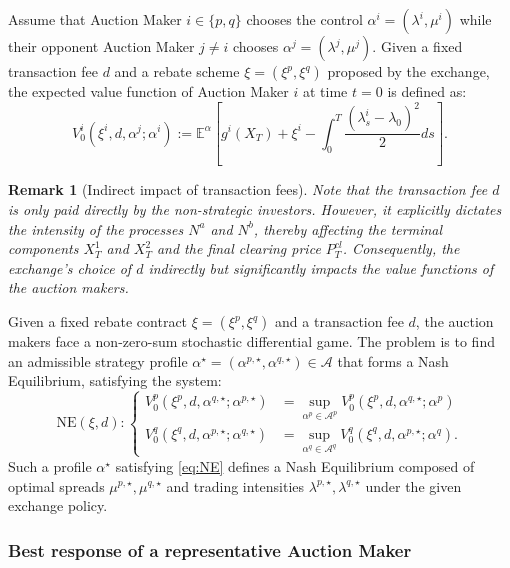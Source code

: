 \documentclass[12pt]{article}
\newtheorem{remark}[theorem2]{Remark}
\begin{document}
Assume that Auction Maker $i \in \{p,q\}$ chooses the control $\alpha^i=(\lambda^i,\mu^i)$ while their opponent Auction Maker $j \neq i$ chooses $\alpha^j=(\lambda^j,\mu^j)$. Given a fixed transaction fee $d$ and a rebate scheme $\xi=(\xi^p,\xi^q)$ proposed by the exchange, the expected value function of Auction Maker $i$ at time $t=0$ is defined as:
\[ V^i_0(\xi^i,d,\alpha^j; \alpha^i) := \mathbb{E}^{\alpha} \left[ g^i(X_T) + \xi^i - \int_0^T \frac{(\lambda^i_s - \lambda_0 )^2}{2} ds \right]. \]

\begin{remark}[Indirect impact of transaction fees]
Note that the transaction fee $d$ is only paid directly by the non-strategic investors. However, it explicitly dictates the intensity of the processes $N^a$ and $N^b$, thereby affecting the terminal components $X^1_T$ and $X^2_T$ and the final clearing price $P^{cl}_T$. Consequently, the exchange's choice of $d$ indirectly but significantly impacts the value functions of the auction makers.
\end{remark}

Given a fixed rebate contract $\xi = (\xi^p,\xi^q)$ and a transaction fee $d$, the auction makers face a non-zero-sum stochastic differential game. The problem is to find an admissible strategy profile $\alpha^\star=(\alpha^{p,\star},\alpha^{q,\star}) \in \mathcal{A}$ that forms a Nash Equilibrium, satisfying the system:
\begin{equation}\label{eq:NE}
\text{NE}(\xi,d):
\begin{cases}
V^{p}_0(\xi^p,d,\alpha^{q,\star};\alpha^{p,\star}) &= \sup_{\alpha^p \in \mathcal{A}^p} V^p_0(\xi^p,d,\alpha^{q,\star}; \alpha^p) \\
V^{q}_0(\xi^q,d,\alpha^{p,\star};\alpha^{q,\star}) &= \sup_{\alpha^q \in \mathcal{A}^q} V^q_0(\xi^q,d,\alpha^{p,\star}; \alpha^q).
\end{cases}
\end{equation}
Such a profile $\alpha^\star$ satisfying \eqref{eq:NE} defines a Nash Equilibrium composed of optimal spreads $\mu^{p,\star}, \mu^{q,\star}$ and trading intensities $\lambda^{p,\star}, \lambda^{q,\star}$ under the given exchange policy.


\subsubsection{Best response of a representative Auction Maker} 
\end{document}
